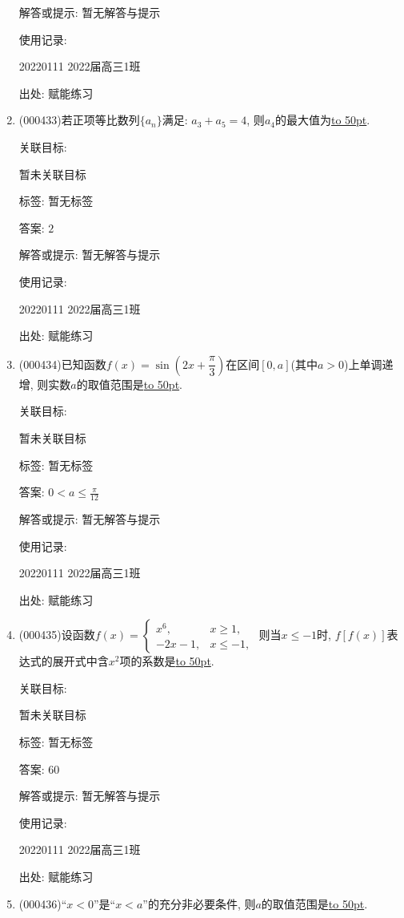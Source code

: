 \documentclass[10pt,a4paper]{article}
\newcommand{\blank}[1]{\underline{\hbox to #1pt{}}}
\begin{document}
\begin{enumerate}[1.]
解答或提示: 暂无解答与提示

使用记录:

20220111	2022届高三1班	


出处: 赋能练习
\item { (000433)}若正项等比数列$\{a_n\}$满足: $a_3+a_5=4$, 则$a_4$的最大值为\blank{50}.


关联目标:

暂未关联目标



标签: 暂无标签

答案: $2$

解答或提示: 暂无解答与提示

使用记录:

20220111	2022届高三1班	


出处: 赋能练习
\item { (000434)}已知函数$f(x)=\sin (2x+\dfrac\pi 3)$在区间$[0,a]$(其中$a>0$)上单调递增, 则实数$a$的取值范围是\blank{50}.


关联目标:

暂未关联目标



标签: 暂无标签

答案: $0<a\le \frac{\pi }{12}$

解答或提示: 暂无解答与提示

使用记录:

20220111	2022届高三1班	


出处: 赋能练习
\item { (000435)}设函数$f(x)=\begin{cases}    x^6, & x\ge 1,  \\   -2x-1, & x\le -1, \end{cases}$ 则当$x\le -1$时, $f[f(x)]$表达式的展开式中含${x^2}$项的系数是\blank{50}.


关联目标:

暂未关联目标



标签: 暂无标签

答案: $60$

解答或提示: 暂无解答与提示

使用记录:

20220111	2022届高三1班	


出处: 赋能练习
\item { (000436)}``$x<0$''是``$x<a$''的充分非必要条件, 则$a$的取值范围是\blank{50}.



\end{enumerate}
\end{document}
